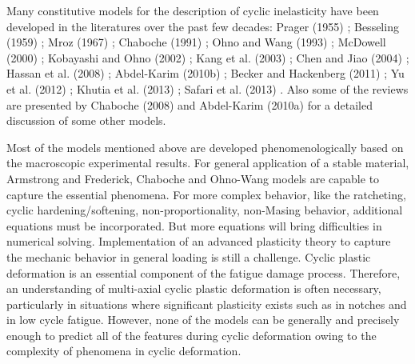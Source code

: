 Many constitutive models for the description of cyclic inelasticity have been developed in the literatures over
the past few decades: Prager (1955) \cite{prager1955new}; Besseling (1959) \cite{besseling1959theory}; Mroz (1967) \cite{mroz1967description}; Chaboche (1991) \cite{Chaboche1991661}; Ohno and Wang (1993) \cite{Ohno1993375};
McDowell (2000) \cite{McDowell2000293}; Kobayashi and Ohno (2002) \cite{kobayashi2002implementation}; Kang et al. (2003) \cite{Kang20031801}; Chen and Jiao (2004) \cite{Chen2004871}; Hassan et al. (2008) \cite{Hassan20081863};
Abdel-Karim (2010b) \cite{AbdelKarim2010170}; Becker and Hackenberg (2011) \cite{Becker2011596}; Yu et al. (2012) \cite{Yu201288}; Khutia et al. (2013) \cite{Khutia201388}; Safari et al. (2013) \cite{Safari2013402}.
Also some of the reviews are presented by Chaboche (2008) \cite{Chaboche20081642} and Abdel-Karim (2010a) \cite{AbdelKarim2010711} for a detailed discussion of some other models.

Most of the models mentioned above are developed phenomenologically based on the macroscopic experimental results.
For general application of a stable material, Armstrong and Frederick, Chaboche and Ohno-Wang models are capable to capture the essential phenomena.
For more complex behavior, like the ratcheting, cyclic hardening/softening, non-proportionality, non-Masing behavior, additional equations must be incorporated.
But more equations will bring difficulties in numerical solving.
Implementation of an advanced plasticity theory to capture the mechanic behavior in general loading is still a challenge.
Cyclic plastic deformation is an essential component of the fatigue damage process.
Therefore, an understanding of multi-axial cyclic plastic deformation is often necessary, particularly in situations where significant plasticity exists such as in notches and in low cycle fatigue.
However, none of the models can be generally and precisely enough to predict all of the features during cyclic deformation owing to the complexity of phenomena in cyclic deformation.

